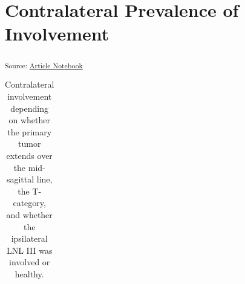 \documentclass[
  sn-mathphys-num,
]{sn-jnl}
\begin{document}
\section{Contralateral Prevalence of
Involvement}\label{contralateral-prevalence-of-involvement}

\textsubscript{Source:
\href{https://rmnldwg.github.io/bilateral-paper/manuscript-preview.html}{Article
Notebook}}

\begin{longtable}[]{@{}llllllllllll@{}}

\caption{\label{tbl-data-strat}Contralateral involvement depending on
whether the primary tumor extends over the mid-sagittal line, the
T-category, and whether the ipsilateral LNL III was involved or
healthy.}

\tabularnewline


\end{longtable}
\end{document}
